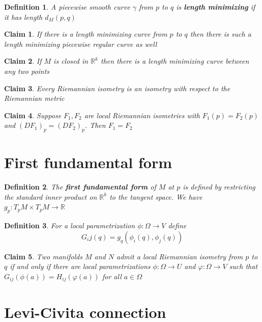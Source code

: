 \documentclass{article}
\newtheorem{definition}{Definition}
\newtheorem{claim}{Claim}
\begin{document}
\begin{definition}
    A piecewise smooth curve $\gamma$ from $p$ to $q$ is \textbf{length minimizing} if it has length $d_M(p,q)$
\end{definition}

\begin{claim}
    If there is a length minimizing curve from $p$ to $q$ then there is such a length minimizing piecewise regular curve as well 
\end{claim}

\begin{claim}
    If $M$ is closed in $\mathbb{R}^k$ then there is a length minimizing curve between any two points
\end{claim}

\begin{claim}
    Every Riemannian isometry is an isometry with respect to the Riemannian metric
\end{claim}

\begin{claim}
    Suppose $F_1,F_2$ are local Riemannian isometries with $F_1(p)=F_2(p)$ and $(DF_1)_p=(DF_2)_p$. Then $F_1=F_2$ 
\end{claim}

\section{First fundamental form}

\begin{definition}
    The \textbf{first fundamental form} of $M$ at $p$ is defined by restricting the standard inner product on $\mathbb{R}^k$ to the tangent space. We have $g_p: T_pM \times T_pM \to \mathbb{R}$
\end{definition}

\begin{definition}
For a local parametrization $\phi:\Omega \to V$ define \[G_ij(q)=g_q(\phi_i(q),\phi_j(q))\]
\end{definition}

\begin{claim}
    Two manifolds $M$ and $N$ admit a local Riemannian isometry from $p$ to $q$ if and only if there are local parametrizations $\phi: \Omega \to U$ and $\varphi : \Omega \to V$ such that $G_{ij}(\phi(a))=H_{ij}(\varphi(a))$ for all $a \in \Omega$
\end{claim}

\section{Levi-Civita connection}
\end{document}
